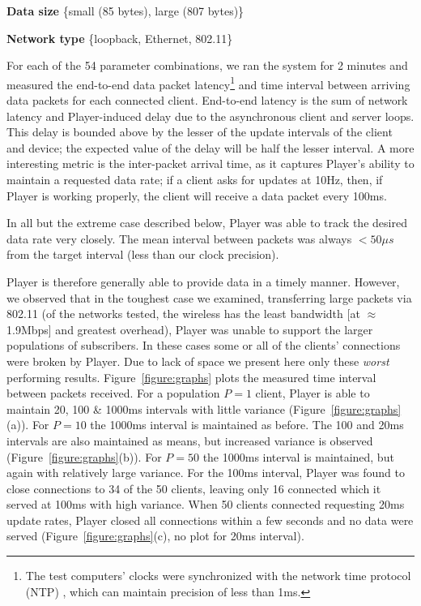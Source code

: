 {\bf Data size} \{small (85 bytes), large (807 bytes)\}

{\bf Network type} \{loopback, Ethernet, 802.11\}

\noindent For each of the 54 parameter combinations, we ran the system for 2
minutes and measured the end-to-end data packet latency\footnote{The
  test computers' clocks were synchronized with the network time
  protocol (NTP) \cite{RFC1305}, which can maintain precision of less
  than 1ms.} and time interval between arriving data packets
for each connected client.  End-to-end latency is the sum of network
latency and Player-induced delay due to the asynchronous client and
server loops.  This delay is bounded above by the lesser of the
update intervals of the client and device;  the expected value
of the delay will be half the lesser interval.
A more interesting metric is the
inter-packet arrival time, as it captures Player's ability to maintain
a requested data rate; if a client asks for updates at 10Hz, then, if
Player is working properly, the client will receive a data packet
every 100ms.

In all but the extreme case described below, Player was able to track
the desired data rate very closely. The mean interval between packets
was always $<50{\mu}s$ from the target interval (less than our clock
precision).

Player is therefore generally able to provide data in a timely manner.
However, we observed that in the toughest case we examined,
transferring large packets via 802.11 (of the networks tested, the
wireless has the least bandwidth [at $\approx$1.9Mbps] and 
greatest overhead), Player was
unable to support the larger populations of subscribers. In these
cases some or all of the clients' connections were broken by Player.
Due to lack of space we present here only these {\it worst} performing
results.  Figure~\ref{figure:graphs} plots the measured
time interval between packets received. For a population $P=1$ client,
Player is able to maintain 20, 100 \& 1000ms intervals with little
variance (Figure~\ref{figure:graphs}(a)). For $P=10$ the 1000ms interval is
maintained as before. The 100 and 20ms intervals are also maintained as
means, but increased variance is observed
(Figure~\ref{figure:graphs}(b)). For $P=50$ the 1000ms interval is
maintained, but again with relatively large variance. For the 100ms
interval, Player was found to close connections to 34 of the 50 clients,
leaving only 16 connected which it served at 100ms with high variance.
When 50 clients connected requesting 20ms update rates, Player closed
all connections within a few seconds and no data were served
(Figure~\ref{figure:graphs}(c), no plot for 20ms interval).

